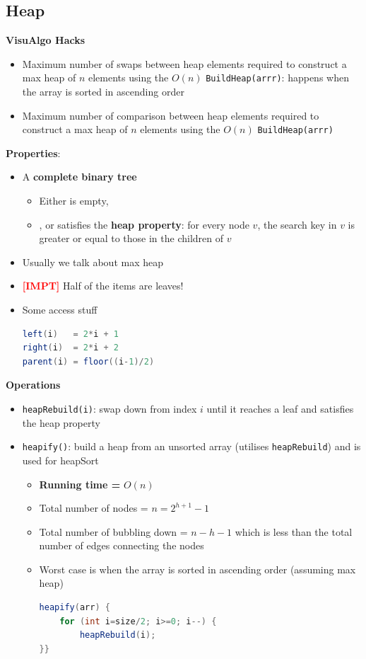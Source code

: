 \documentclass{article}
\newcommand{\impt}[0]{\textcolor{red}{\textbf{[IMPT] }}}
\begin{document}
\begin{multicols}{2}
\subsection{Heap}
\textbf{VisuAlgo Hacks}
\begin{itemize}
	\item Maximum number of swaps between heap elements required to construct a max heap of $n$ elements using the $O(n)$ \texttt{BuildHeap(arrr)}: happens when the array is sorted in ascending order
	\item Maximum number of comparison between heap elements required to construct a max heap of $n$ elements using the $O(n)$ \texttt{BuildHeap(arrr)}
\end{itemize}
\textbf{Properties}:
\begin{itemize}
	\item A \textbf{complete binary tree}
	\begin{itemize}
		\item Either is empty,
		\item, or satisfies the \textbf{heap property}: for every node $v$, the search key in $v$ is greater or equal to those in the children of $v$
	\end{itemize}
    \item Usually we talk about max heap
    \item \impt Half of the items are leaves!
    \item Some access stuff
    \begin{lstlisting}[language=Java]
left(i)   = 2*i + 1
right(i)  = 2*i + 2
parent(i) = floor((i-1)/2)\end{lstlisting}
\end{itemize}
\textbf{Operations}
\begin{itemize}
	\item \texttt{heapRebuild(i)}: swap down from index $i$ until it reaches a leaf and satisfies the heap property
	\item \texttt{heapify()}: build a heap from an unsorted array (utilises \texttt{heapRebuild}) and is used for heapSort
	\begin{itemize}
		\item \textbf{Running time = }$O(n)$
		\item Total number of nodes = $n = 2^{h+1} - 1$
		\item Total number of bubbling down = $n-h-1$ which is less than the total number of edges connecting the nodes
		\item Worst case is when the array is sorted in ascending order (assuming max heap)
		\begin{lstlisting}[language=Java]
heapify(arr) {
	for (int i=size/2; i>=0; i--) {
		heapRebuild(i);
}}
\end{lstlisting}
	\end{itemize}


\end{itemize}
\end{multicols}
\end{document}
